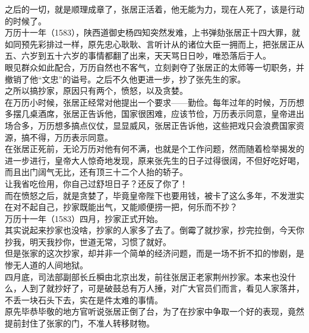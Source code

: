 \begin{multicols}{\theparacolNo}
之后的一切，就是顺理成章了，张居正活着，他无能为力，现在人死了，该是行动的时候了。\\

万历十一年（1583），陕西道御史杨四知突然发难，上书弹劾张居正十四大罪，就如同预先彩排过一样，原先忠心耿耿、言听计从的诸位大臣一拥而上，把张居正从五、六岁到五十六岁的事情都翻了出来，天天骂日日吵，唯恐落后于人。\\

眼见群众如此配合，万历自然也不客气，立刻剥夺了张居正的太师等一切职务，并撤销了他“文忠”的谥号。之后不久他更进一步，抄了张先生的家。\\

之所以搞抄家，原因只有两个，愤怒，以及贪婪。\\

在万历小时候，张居正经常对他提出一个要求——勤俭。每年过年的时候，万历想多摆几桌酒席，张居正告诉他，国家很困难，应该节俭，万历表示同意，皇帝进出场合多，万历想多搞点仪仗，显显威风，张居正告诉他，这些把戏只会浪费国家资源，搞不得，万历表示同意。\\

在张居正死前，无论万历对他有何不满，也就是个工作问题，然而随着检举揭发的进一步进行，皇帝大人惊奇地发现，原来张先生的日子过得很阔，不但好吃好喝，而且出门阔气无比，还有顶三十二个人抬的轿子。\\

让我省吃俭用，你自己过舒坦日子？还反了你了！\\

而在愤怒之后，就是贪婪了，毕竟皇帝陛下也要用钱，被卡了这么多年，不发泄实在对不起自己，抄家既能出气，又能顺便捞一把，何乐而不抄？\\

万历十一年（1583）四月，抄家正式开始。\\

其实说起来抄家也没啥，抄家的人家多了去了。倒霉了就抄家，抄完拉倒，今天你抄我，明天我抄你，世道无常，习惯了就好。\\

但是张家的这次抄家，却并非一个简单的经济问题，而是一场不折不扣的惨剧，是惨无人道的人间地狱。\\

四月底，司法部副部长丘橓由北京出发，前往张居正老家荆州抄家。本来也没什么，人到了就抄好了，可是破鼓总有万人捶，对广大官员们而言，看见人家落井，不丢一块石头下去，实在是件太难的事情。\\

原先毕恭毕敬的地方官听说张居正倒了台，为了在抄家中争取一个好的表现，竟然提前封住了张家的门，不准人转移财物。\\


\end{multicols}
